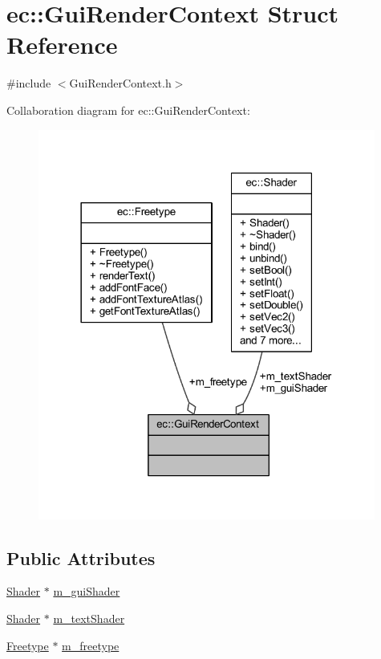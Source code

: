 \hypertarget{structec_1_1_gui_render_context}{}\section{ec\+:\+:Gui\+Render\+Context Struct Reference}
\label{structec_1_1_gui_render_context}


{\ttfamily \#include $<$Gui\+Render\+Context.\+h$>$}



Collaboration diagram for ec\+:\+:Gui\+Render\+Context\+:\nopagebreak
\begin{figure}[H]
\begin{center}
\leavevmode
\includegraphics[width=314pt]{structec_1_1_gui_render_context__coll__graph}
\end{center}
\end{figure}
\subsection*{Public Attributes}
\begin{DoxyCompactItemize}
\item 
\mbox{\hyperlink{classec_1_1_shader}{Shader}} $\ast$ \mbox{\hyperlink{structec_1_1_gui_render_context_a3e84bcc858adbf27c4b8503d5f960047}{m\+\_\+gui\+Shader}}
\item 
\mbox{\hyperlink{classec_1_1_shader}{Shader}} $\ast$ \mbox{\hyperlink{structec_1_1_gui_render_context_aa42aa86b9e3f12b973329494a3c89f90}{m\+\_\+text\+Shader}}
\item 
\mbox{\hyperlink{classec_1_1_freetype}{Freetype}} $\ast$ \mbox{\hyperlink{structec_1_1_gui_render_context_aca121abf7990be17623ef5e34519b768}{m\+\_\+freetype}}
\end{DoxyCompactItemize}


